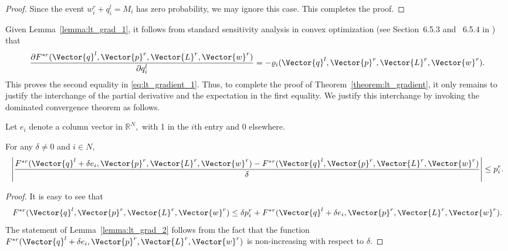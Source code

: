 \begin{proof}
Since the event $w^r_i + q^l_i = M_i$ has zero probability, we may
ignore this case. This completes the proof.
%
%
\end{proof}

Given Lemma~\ref{lemma:lt_grad_1}, it follows from standard
sensitivity analysis in convex optimization (see Section~6.5.3 and
~6.5.4 in \cite{Bertsekas03}) that 
\begin{equation}
  \label{eq:grad_lt}
  \frac{\partial
    F^{*r}(\Vector{q}^l,\Vector{p}^r,\Vector{L}^r,\Vector{w}^r)}
  {\partial q^l_i} =-
  \varrho_i(\Vector{q}^l,\Vector{p}^r,\Vector{L}^r,\Vector{w}^r).  
\end{equation}
This proves the second equality in \eqref{eq:lt_gradient_1}. Thus, to
complete the proof of Theorem~\ref{theorem:lt_gradient}, it only
remains to justify the interchange of the partial derivative and the
expectation in the first equality. We justify this interchange by
invoking the dominated convergence theorem as follows.

Let $e_i$ denote a column vector in $\mathbb{R}^N,$ with 1 in the
$i$th entry and 0 elsewhere.
\begin{lemma}
  \label{lemma:lt_grad_2}
  For any $\delta \neq 0$ and $i \in N,$
  \begin{equation*}
    \left|\frac{F^{*r}(\Vector{q}^l + \delta e_i,\Vector{p}^r,\Vector{L}^r,\Vector{w}^r) - 
        F^{*r}(\Vector{q}^l,\Vector{p}^r,\Vector{L}^r,\Vector{w}^r)}{\delta}\right| \leq p^r_i.
  \end{equation*}  
\end{lemma}
\begin{proof}
  It is easy to see
  that $$F^{*r}(\Vector{q}^l,\Vector{p}^r,\Vector{L}^r,\Vector{w}^r)
  \leq \delta p^r_i + F^{*r}(\Vector{q}^l + \delta
  e_i,\Vector{p}^r,\Vector{L}^r,\Vector{w}^r).$$ The statement of
  Lemma~\ref{lemma:lt_grad_2} follows from the fact that
  the function $F^{*r}(\Vector{q}^l + \delta
  e_i,\Vector{p}^r,\Vector{L}^r,\Vector{w}^r)$ is non-increasing with
  respect to $\delta.$
\end{proof}

